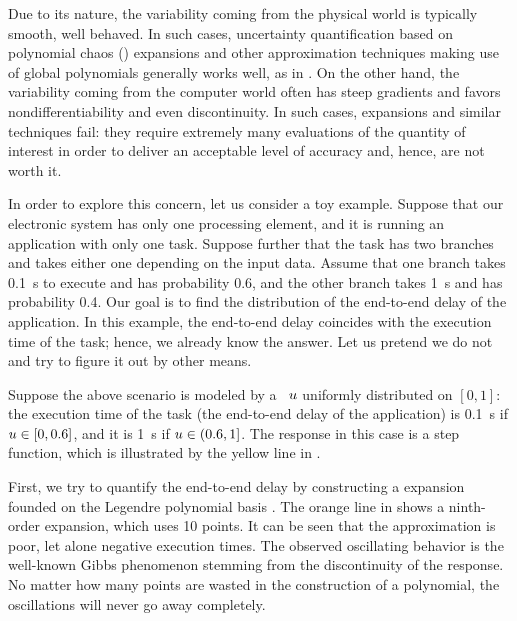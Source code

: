 
Due to its nature, the variability coming from the physical world is typically
smooth, well behaved. In such cases, uncertainty quantification based on
polynomial chaos () expansions \cite{xiu2010} and other approximation
techniques making use of global polynomials generally works well, as in
\cite{bhardwaj2008, lee2013, ukhov2014, ukhov2015}. On the other hand, the
variability coming from the computer world often has steep gradients and favors
nondifferentiability and even discontinuity. In such cases,  expansions
and similar techniques fail: they require extremely many evaluations of the
quantity of interest in order to deliver an acceptable level of accuracy and,
hence, are not worth it.

In order to explore this concern, let us consider a toy example. Suppose that
our electronic system has only one processing element, and it is running an
application with only one task. Suppose further that the task has two branches
and takes either one depending on the input data. Assume that one branch takes
0.1~s to execute and has probability 0.6, and the other branch takes 1~s and has
probability 0.4. Our goal is to find the distribution of the end-to-end delay of
the application. In this example, the end-to-end delay coincides with the
execution time of the task; hence, we already know the answer. Let us pretend we
do not and try to figure it out by other means.

Suppose the above scenario is modeled by a \rv\ $u$ uniformly distributed on
$[0, 1]$: the execution time of the task (the end-to-end delay of the
application) is 0.1~s if $u \in [0, 0.6]$, and it is 1~s if $u \in (0.6, 1]$.
The response in this case is a step function, which is illustrated by the yellow
line in .

First, we try to quantify the end-to-end delay by constructing a 
expansion founded on the Legendre polynomial basis \cite{xiu2010}. The orange
line in  shows a ninth-order  expansion, which uses 10
points. It can be seen that the approximation is poor, let alone negative
execution times. The observed oscillating behavior is the well-known Gibbs
phenomenon stemming from the discontinuity of the response. No matter how many
points are wasted in the construction of a polynomial, the oscillations will
never go away completely.

